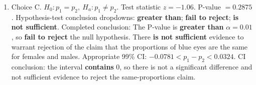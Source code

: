 \documentclass[11pt]{article}
\begin{document}
\begin{enumerate}[leftmargin=*]
\item Choice C. \(H_0:p_1=p_2,\ H_a:p_1\ne p_2\). Test statistic \(z=-1.06\). P-value \(=0.2875\). Hypothesis-test conclusion dropdowns: \textbf{greater than}; \textbf{fail to reject}; \textbf{is not sufficient}. Completed conclusion: The P-value is \textbf{greater than} \(\alpha=0.01\), so \textbf{fail to reject} the null hypothesis. There \textbf{is not sufficient} evidence to warrant rejection of the claim that the proportions of blue eyes are the same for females and males. Appropriate 99\% CI: \(-0.0781<p_1-p_2<0.0324\). CI conclusion: the interval \textbf{contains} 0, so there is not a significant difference and not sufficient evidence to reject the same-proportions claim.
\end{enumerate}
\end{document}
